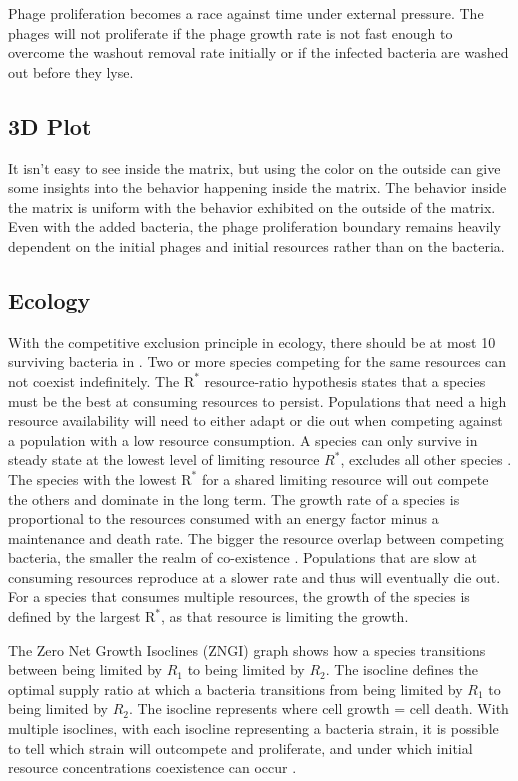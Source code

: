 Phage proliferation becomes a race against time under external pressure. 
The phages will not proliferate if the phage growth rate is not fast enough to overcome the washout removal rate initially or if the infected bacteria are washed out before they lyse. 

\subsection{3D Plot}
It isn't easy to see inside the matrix, but using the color on the outside can give some insights into the behavior happening inside the matrix. 
The behavior inside the matrix is uniform with the behavior exhibited on the outside of the matrix. 
Even with the added bacteria, the phage proliferation boundary remains heavily dependent on the initial phages and initial resources rather than on the bacteria. 

\subsection{Ecology}
With the competitive exclusion principle in ecology, there should be at most 10 surviving bacteria in  \cite{hardinCompetitiveExclusionPrinciple1960}. 
Two or more species competing for the same resources can not coexist indefinitely. 
The $\text{R}^{*}$ resource-ratio hypothesis states that a species must be the best at consuming resources to persist. 
Populations that need a high resource availability will need to either adapt or die out when competing against a population with a low resource consumption. 
A species can only survive in steady state at the lowest level of limiting resource $R^{*}$, excludes all other species \cite{juRuleEnergyFlux2009}. 
The species with the lowest $\text{R}^{*}$ for a shared limiting resource will out compete the others and dominate in the long term.
The growth rate of a species is proportional to the resources consumed with an energy factor minus a maintenance and death rate. 
The bigger the resource overlap between competing bacteria, the smaller the realm of co-existence \cite{vandenbergEcologicalModellingApproaches2022}. 
Populations that are slow at consuming resources reproduce at a slower rate and thus will eventually die out. 
For a species that consumes multiple resources, the growth of the species is defined by the largest $\text{R}^{*}$, as that resource is limiting the growth. 

The Zero Net Growth Isoclines (ZNGI) graph shows how a species transitions between being limited by $R_1$ to being limited by $R_2$. 
The isocline defines the optimal supply ratio at which a bacteria transitions from being limited by $R_1$ to being limited by $R_2$. 
The isocline represents where cell growth = cell death. 
With multiple isoclines, with each isocline representing a bacteria strain, it is possible to tell which strain will outcompete and proliferate, and under which initial resource concentrations coexistence can occur \cite{smithEffectsResourceSupplies2002}.